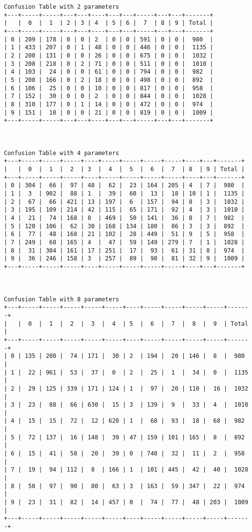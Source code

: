 \documentclass[11pt]{article}
\begin{document}
    \begin{Verbatim}[commandchars=\\\{\}]
Confusion Table with 2 parameters
+---+-----+-----+---+---+----+---+---+-----+---+---+-------+
|   |  0  |  1  | 2 | 3 | 4  | 5 | 6 |  7  | 8 | 9 | Total |
+---+-----+-----+---+---+----+---+---+-----+---+---+-------+
| 0 | 209 | 178 | 0 | 0 | 2  | 0 | 0 | 591 | 0 | 0 |  980  |
| 1 | 433 | 207 | 0 | 1 | 48 | 0 | 0 | 446 | 0 | 0 |  1135 |
| 2 | 200 | 131 | 0 | 0 | 26 | 0 | 0 | 675 | 0 | 0 |  1032 |
| 3 | 208 | 218 | 0 | 2 | 71 | 0 | 0 | 511 | 0 | 0 |  1010 |
| 4 | 103 |  24 | 0 | 0 | 61 | 0 | 0 | 794 | 0 | 0 |  982  |
| 5 | 208 | 166 | 0 | 2 | 18 | 0 | 0 | 498 | 0 | 0 |  892  |
| 6 | 106 |  25 | 0 | 0 | 10 | 0 | 0 | 817 | 0 | 0 |  958  |
| 7 | 152 |  30 | 0 | 0 | 2  | 0 | 0 | 844 | 0 | 0 |  1028 |
| 8 | 310 | 177 | 0 | 1 | 14 | 0 | 0 | 472 | 0 | 0 |  974  |
| 9 | 151 |  18 | 0 | 0 | 21 | 0 | 0 | 819 | 0 | 0 |  1009 |
+---+-----+-----+---+---+----+---+---+-----+---+---+-------+



Confusion Table with 4 parameters
+---+-----+-----+-----+----+-----+-----+-----+-----+----+---+-------+
|   |  0  |  1  |  2  | 3  |  4  |  5  |  6  |  7  | 8  | 9 | Total |
+---+-----+-----+-----+----+-----+-----+-----+-----+----+---+-------+
| 0 | 304 |  66 |  97 | 48 |  62 |  23 | 164 | 205 | 4  | 7 |  980  |
| 1 |  3  | 902 |  88 | 1  |  39 |  60 |  13 |  18 | 10 | 1 |  1135 |
| 2 |  67 |  66 | 421 | 13 | 197 |  6  | 157 |  94 | 8  | 3 |  1032 |
| 3 | 195 | 109 | 214 | 42 | 115 |  65 | 171 |  92 | 4  | 3 |  1010 |
| 4 |  21 |  74 | 168 | 8  | 469 |  50 | 141 |  36 | 8  | 7 |  982  |
| 5 | 120 | 106 |  62 | 30 | 168 | 134 | 180 |  86 | 3  | 3 |  892  |
| 6 |  77 |  48 | 168 | 21 | 102 |  28 | 449 |  51 | 9  | 5 |  958  |
| 7 | 249 |  68 | 165 | 4  |  47 |  59 | 149 | 279 | 7  | 1 |  1028 |
| 8 |  31 | 304 | 161 | 17 | 251 |  17 |  93 |  61 | 31 | 8 |  974  |
| 9 |  36 | 246 | 158 | 3  | 257 |  89 |  98 |  81 | 32 | 9 |  1009 |
+---+-----+-----+-----+----+-----+-----+-----+-----+----+---+-------+



Confusion Table with 8 parameters
+---+-----+-----+-----+-----+-----+----+-----+-----+-----+-----+-------+
|   |  0  |  1  |  2  |  3  |  4  | 5  |  6  |  7  |  8  |  9  | Total |
+---+-----+-----+-----+-----+-----+----+-----+-----+-----+-----+-------+
| 0 | 135 | 200 |  74 | 171 |  30 | 2  | 194 |  20 | 146 |  8  |  980  |
| 1 |  22 | 961 |  53 |  37 |  0  | 2  |  25 |  1  |  34 |  0  |  1135 |
| 2 |  29 | 125 | 339 | 171 | 124 | 1  |  97 |  20 | 110 |  16 |  1032 |
| 3 |  23 |  88 |  66 | 630 |  15 | 3  | 139 |  9  |  33 |  4  |  1010 |
| 4 |  15 |  15 |  72 |  12 | 620 | 1  |  68 |  93 |  18 |  68 |  982  |
| 5 |  72 | 137 |  16 | 148 |  39 | 47 | 159 | 101 | 165 |  8  |  892  |
| 6 |  15 |  41 |  58 |  20 |  39 | 0  | 740 |  32 |  11 |  2  |  958  |
| 7 |  19 |  94 | 112 |  8  | 166 | 1  | 101 | 445 |  42 |  40 |  1028 |
| 8 |  50 |  97 |  90 |  80 |  63 | 3  | 163 |  59 | 347 |  22 |  974  |
| 9 |  23 |  31 |  82 |  14 | 457 | 0  |  74 |  77 |  48 | 203 |  1009 |
+---+-----+-----+-----+-----+-----+----+-----+-----+-----+-----+-------+




\end{Verbatim}
\end{document}
